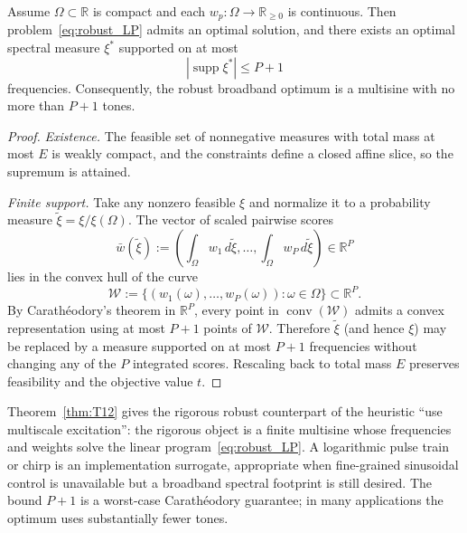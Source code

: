 \begin{theorem}
\label{thm:T12}
Assume \(\Omega \subset \mathbb{R}\) is compact and each \(w_p : \Omega \to \mathbb{R}_{\ge 0}\) is continuous. Then problem~\eqref{eq:robust_LP} admits an optimal solution, and there exists an optimal spectral measure \(\xi^{*}\) supported on at most
\begin{equation}
\boxed{
|\operatorname{supp} \xi^{*}| \le P + 1
}
\label{eq:T12_support}
\end{equation}
frequencies. Consequently, the robust broadband optimum is a multisine with no more than \(P+1\) tones.
\end{theorem}

\begin{proof}
\emph{Existence.} The feasible set of nonnegative measures with total mass at most \(E\) is weakly compact, and the constraints define a closed affine slice, so the supremum is attained.

\emph{Finite support.} Take any nonzero feasible \(\xi\) and normalize it to a probability measure \(\tilde\xi = \xi / \xi(\Omega)\). The vector of scaled pairwise scores
\[
\bar w(\tilde\xi) :=
\left( \int_{\Omega} w_1\, d\tilde\xi, \dots, \int_{\Omega} w_P\, d\tilde\xi \right)
\in \mathbb{R}^P
\]
lies in the convex hull of the curve
\[
\mathcal{W} := \big\{ (w_1(\omega), \dots, w_P(\omega)) : \omega \in \Omega \big\} \subset \mathbb{R}^P.
\]
By Carath\'eodory's theorem in \(\mathbb{R}^P\), every point in \(\operatorname{conv}(\mathcal{W})\) admits a convex representation using at most \(P+1\) points of \(\mathcal{W}\). Therefore \(\tilde\xi\) (and hence \(\xi\)) may be replaced by a measure supported on at most \(P+1\) frequencies without changing any of the \(P\) integrated scores. Rescaling back to total mass \(E\) preserves feasibility and the objective value \(t\).
\end{proof}

\begin{remark}
Theorem~\ref{thm:T12} gives the rigorous robust counterpart of the heuristic ``use multiscale excitation'': the rigorous object is a finite multisine whose frequencies and weights solve the linear program~\eqref{eq:robust_LP}. A logarithmic pulse train or chirp is an implementation surrogate, appropriate when fine-grained sinusoidal control is unavailable but a broadband spectral footprint is still desired. The bound \(P+1\) is a worst-case Carath\'eodory guarantee; in many applications the optimum uses substantially fewer tones.
\end{remark}

